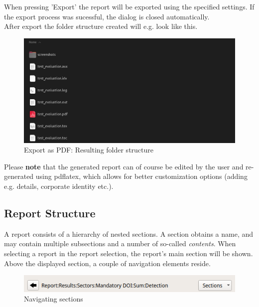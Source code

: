 When pressing 'Export' the report will be exported using the specified settings.
If the export process was sucessful, the dialog is closed automatically. \\

After export the folder structure created will e.g. look like this.

\begin{figure}[H]
    \hspace*{-2.5cm}
    \center
    \includegraphics[width=14cm,frame]{figures/export_pdf_result.png}
  \caption{Export as PDF: Resulting folder structure}
\end{figure}

Please \textbf{note} that the generated report can of course be edited by the user and re-generated using pdflatex, 
which allows for better customization options (adding e.g. details, corporate identity etc.).

\subsection{Report Structure}

A report consists of a hierarchy of nested sections. 
A section obtains a name, and may contain multiple subsections and a number of so-called \textit{contents}.
When selecting a report in the report selection, the report's main section will be shown. \\

Above the displayed section, a couple of navigation elements reside.

\begin{figure}[H]
    \hspace*{-2.5cm}
    \center
    \includegraphics[width=12cm,frame]{figures/navigation.png}
  \caption{Navigating sections}
\end{figure}

